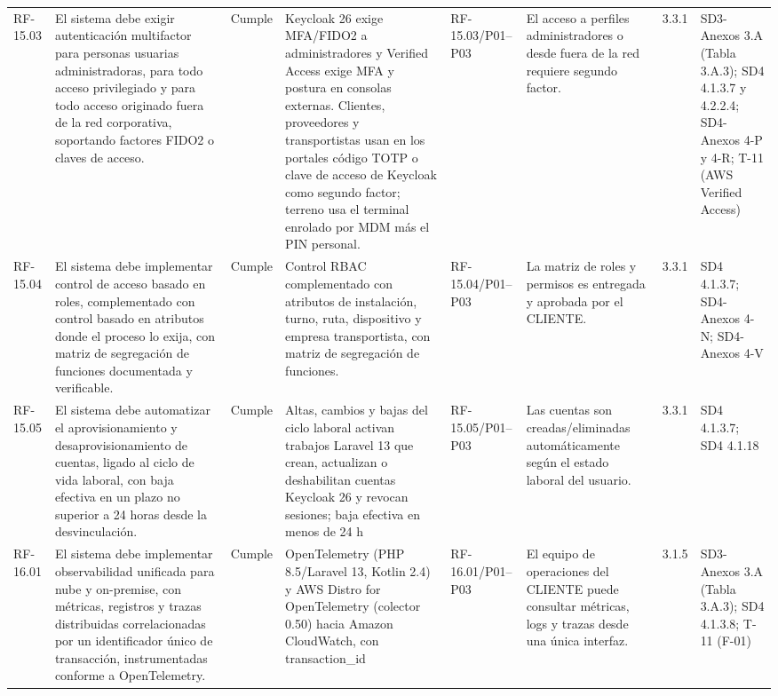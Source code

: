 \documentclass[oficio,firma,final]{lafrox}
\begin{document}
\begin{landscape}
{\begin{longtable}{@{}F{0.054} F{0.173} F{0.061} F{0.191} F{0.106} F{0.180} F{0.067} F{0.168}@{}}
  RF-15.03 & El sistema debe exigir autenticación multifactor para personas usuarias administradoras, para todo acceso privilegiado y para todo acceso originado fuera de la red corporativa, soportando factores FIDO2 o claves de acceso. & Cumple & Keycloak 26 exige MFA/FIDO2 a administradores y Verified Access exige MFA y postura en consolas externas. Clientes, proveedores y transportistas usan en los portales código TOTP o clave de acceso de Keycloak como segundo factor; terreno usa el terminal enrolado por MDM más el PIN personal. & RF-15.03/\allowbreak{}P01--\allowbreak{}P03 & El acceso a perfiles administradores o desde fuera de la red requiere segundo factor. & 3.3.1 & SD3-Anexos 3.A (Tabla 3.A.3); SD4 4.1.3.7 y 4.2.2.4; SD4-Anexos 4-P y 4-R; T-11 (AWS Verified Access)  \\
  RF-15.04 & El sistema debe implementar control de acceso basado en roles, complementado con control basado en atributos donde el proceso lo exija, con matriz de segregación de funciones documentada y verificable. & Cumple & Control RBAC complementado con atributos de instalación, turno, ruta, dispositivo y empresa transportista, con matriz de segregación de funciones. & RF-15.04/\allowbreak{}P01--\allowbreak{}P03 & La matriz de roles y permisos es entregada y aprobada por el CLIENTE. & 3.3.1 & SD4 4.1.3.7; SD4-Anexos 4-N; SD4-Anexos 4-V  \\
  RF-15.05 & El sistema debe automatizar el aprovisionamiento y desaprovisionamiento de cuentas, ligado al ciclo de vida laboral, con baja efectiva en un plazo no superior a 24 horas desde la desvinculación. & Cumple & Altas, cambios y bajas del ciclo laboral activan trabajos Laravel 13 que crean, actualizan o deshabilitan cuentas Keycloak 26 y revocan sesiones; baja efectiva en menos de 24 h & RF-15.05/\allowbreak{}P01--\allowbreak{}P03 & Las cuentas son creadas/eliminadas automáticamente según el estado laboral del usuario. & 3.3.1 & SD4 4.1.3.7; SD4 4.1.18  \\
  RF-16.01 & El sistema debe implementar observabilidad unificada para nube y on-premise, con métricas, registros y trazas distribuidas correlacionadas por un identificador único de transacción, instrumentadas conforme a OpenTelemetry. & Cumple & OpenTelemetry (PHP 8.5/Laravel 13, Kotlin 2.4) y AWS Distro for OpenTelemetry (colector 0.50) hacia Amazon CloudWatch, con transaction\_id & RF-16.01/\allowbreak{}P01--\allowbreak{}P03 & El equipo de operaciones del CLIENTE puede consultar métricas, logs y trazas desde una única interfaz. & 3.1.5 & SD3-Anexos 3.A (Tabla 3.A.3); SD4 4.1.3.8; T-11 (F-01)  \\

\end{longtable}}
\end{landscape}
\end{document}
